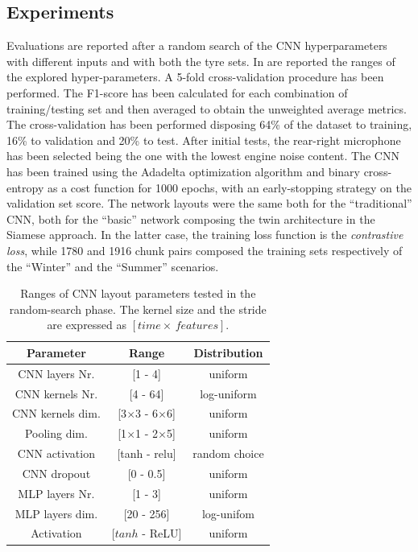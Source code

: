 \subsection{Experiments}  

Evaluations are reported after a random search of the CNN hyperparameters with different inputs and with both the tyre sets. In  are reported the ranges of the explored hyper-parameters. A 5-fold cross-validation procedure has been performed. The F1-score has been calculated for each combination of training/testing set and then averaged to obtain the unweighted average metrics. The cross-validation has been performed disposing 64\% of the dataset to training, 16\% to validation and 20\% to test. After initial tests, the rear-right microphone has been selected being the one with the lowest engine noise content.
The CNN has been trained using the Adadelta optimization algorithm and binary cross-entropy as a cost function for 1000 epochs, with an early-stopping strategy on the validation set score. The network layouts were the same both for the ``traditional'' CNN, both for the ``basic'' network composing the twin architecture in the Siamese approach. In the latter case, the training loss function is the \textit{contrastive loss}, while 1780 and 1916 chunk pairs composed the training sets respectively of the ``Winter'' and the ``Summer'' scenarios.

 
\begin{table}[htbp]
	\footnotesize
	\centering
		\centering
		\begin{tabular} {|c | c | c|}
			\hline
			Parameter & Range & Distribution\\  
			\hline
			\hline
			CNN layers Nr.  & [1 - 4]& uniform \\
			\hline
			CNN kernels Nr. & [4 - 64]& log-uniform \\
			\hline
			CNN kernels dim. & [3$\times$3 - 6$\times$6]& uniform \\
			\hline
			Pooling dim. & [1$\times$1 - 2$\times$5] & uniform 	\\
			\hline
			CNN activation & [tanh - relu] & random choice \\
			\hline
			CNN dropout  & [0 - 0.5]	& uniform  \\
			\hline                                     
			MLP layers Nr.  & [1 - 3]& uniform \\
			\hline                                     
			MLP layers dim. & [20 - 256]& log-unifom \\
			\hline                                     
			Activation & [$tanh$ - ReLU] & uniform\\
			\hline

		\end{tabular}		
	\caption[Road Surface Roughness Classification - Experiments]{Ranges of CNN layout parameters tested in the random-search phase. The kernel size and the stride are expressed as $[time\times\,features]$.}
	\label{tbl:config_names}
\end{table}

